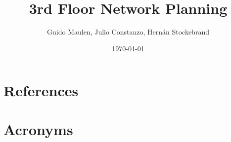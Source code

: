 \documentclass[PMO,authoryear,toc]{lsstdoc}
\title{3rd Floor Network Planning}
\author{%
Guido Maulen, Julio Constanzo, Hernán Stockebrand 
}
\date{\today}
\begin{document}
\maketitle





\appendix
\section{References} \label{sec:bib}
\renewcommand{\refname}{} %


\section{Acronyms} \label{sec:acronyms}

\end{document}
